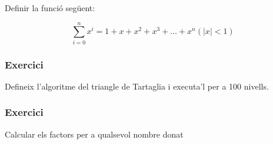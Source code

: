 Definir la funció següent:

\[
\sum_{i=0}^{n}x^{i}=1+x+x^{2}+x^{3}+\ldots + x^{n} \left( \left| x \right| <1 \right)
\]



\subsubsection*{Exercici } 

Defineix l'algoritme del triangle de Tartaglia i executa'l per a 100 nivells.



\subsubsection*{Exercici } 

Calcular els factors per a qualsevol nombre donat
